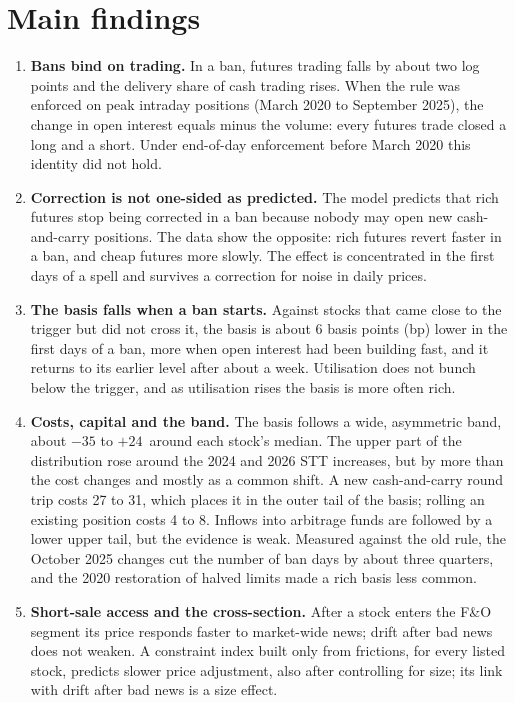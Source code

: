 \section{Main findings}
\begin{enumerate}
\item \textbf{Bans bind on trading.} In a ban, futures trading falls by about two log points and the delivery share of cash
trading rises. When the rule was enforced on peak intraday positions (March 2020 to September 2025), the change in open
interest equals minus the volume: every futures trade closed a long and a short. Under end-of-day enforcement before March
2020 this identity did not hold.
\item \textbf{Correction is not one-sided as predicted.} The model predicts that rich futures stop being corrected in a ban
because nobody may open new cash-and-carry positions. The data show the opposite: rich futures revert faster in a ban, and
cheap futures more slowly. The effect is concentrated in the first days of a spell and survives a correction for noise in
daily prices.
\item \textbf{The basis falls when a ban starts.} Against stocks that came close to the trigger but did not cross it, the
basis is about 6 basis points (bp) lower in the first days of a ban, more when open interest had been building fast, and
it returns to its earlier level after about a week. Utilisation does not bunch below the trigger, and as utilisation rises
the basis is more often rich.
\item \textbf{Costs, capital and the band.} The basis follows a wide, asymmetric band, about $-35$ to $+24$\bp\ around each
stock's median. The upper part of the distribution rose around the 2024 and 2026 STT increases, but by more than the cost
changes and mostly as a common shift. A new cash-and-carry round trip costs 27 to 31\bp, which places it in the outer tail
of the basis; rolling an existing position costs 4 to 8\bp. Inflows into arbitrage funds are followed by a lower upper
tail, but the evidence is weak. Measured against the old rule, the October 2025 changes cut the number of
ban days by about three quarters, and the 2020 restoration of halved limits made a rich basis less common.
\item \textbf{Short-sale access and the cross-section.} After a stock enters the F\&O segment its price responds faster to
market-wide news; drift after bad news does not weaken. A constraint index built only from frictions, for every listed
stock, predicts slower price adjustment, also after controlling for size; its link with drift after bad news is a size
effect.
\end{enumerate}

